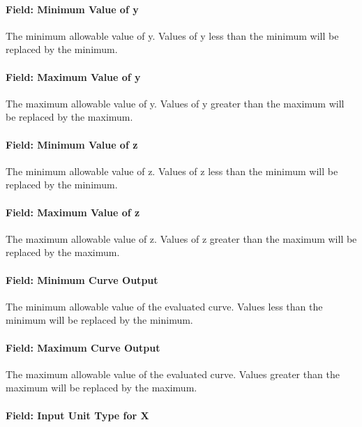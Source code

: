 \paragraph{Field: Minimum Value of y}\label{field-minimum-value-of-y-6}

The minimum allowable value of y. Values of y less than the minimum will be replaced by the minimum.

\paragraph{Field: Maximum Value of y}\label{field-maximum-value-of-y-6}

The maximum allowable value of y. Values of y greater than the maximum will be replaced by the maximum.

\paragraph{Field: Minimum Value of z}\label{field-minimum-value-of-z-2}

The minimum allowable value of z. Values of z less than the minimum will be replaced by the minimum.

\paragraph{Field: Maximum Value of z}\label{field-maximum-value-of-z-2}

The maximum allowable value of z. Values of z greater than the maximum will be replaced by the maximum.

\paragraph{Field: Minimum Curve Output}\label{field-minimum-curve-output-10}

The minimum allowable value of the evaluated curve. Values less than the minimum will be replaced by the minimum.

\paragraph{Field: Maximum Curve Output}\label{field-maximum-curve-output-9}

The maximum allowable value of the evaluated curve. Values greater than the maximum will be replaced by the maximum.

\paragraph{Field: Input Unit Type for X}\label{field-input-unit-type-for-x-11}

